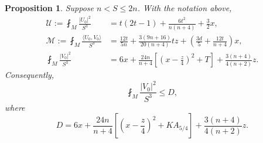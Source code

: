 \documentclass[10pt,a4paper]{amsart}
\numberwithin{equation}{section}
\newtheorem{proposition}[theorem]{Proposition}
\newcommand{\ip}[2]{\langle #1,#2\rangle}
\newcommand{\norm}[1]{\lvert #1\rvert}
\begin{document}
\begin{proposition}\label{prop:fourth}
Suppose $n<S\le2n$. With the notation above,
\begin{align}
\mathcal U
:=\fint_M\frac{\norm{U_0}^2}{S^3}
&=t(2t-1)+\frac{6t^2}{n(n+4)}+\frac32x,
\label{eq:calU}\\
\mathcal M
:=\fint_M\frac{\ip{U_0}{V_0}}{S^3}
&=\frac{12t}{5n}
+\frac{3(9n+16)}{20(n+4)}tz
+\left(\frac{3d}{5}+\frac{12t}{n+4}\right)x,
\label{eq:calM}\\
\fint_M\frac{\norm{V_0}^2}{S^3}
&=6x+\frac{24n}{n+4}
\left[\left(x-\frac z4\right)^2+T\right]
+\frac{3(n+4)}{4(n+2)}z.
\label{eq:V0norm}
\end{align}
Consequently,
\begin{equation}\label{eq:V0D}
\fint_M\frac{\norm{V_0}^2}{S^3}\le D,
\end{equation}
where
\[
D=
6x+\frac{24n}{n+4}
\left[
\left(x-\frac z4\right)^2+KA_{5/4}
\right]
+\frac{3(n+4)}{4(n+2)}z.
\]
\end{proposition}
\end{document}
